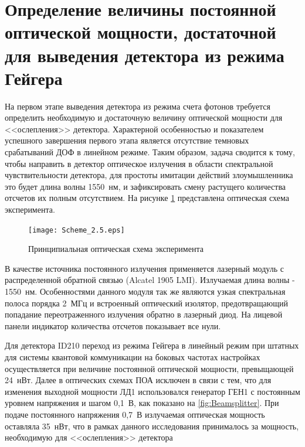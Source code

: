 
\section{Определение величины постоянной оптической мощности, достаточной для выведения детектора из режима Гейгера} \label{sec:ch2/sec5}

На первом этапе выведения детектора из режима счета фотонов требуется определить необходимую и достаточную величину оптической мощности для <<ослепления>> детектора. Характерной особенностью и показателем успешного завершения первого этапа является отсутствие темновых срабатываний ДОФ в линейном режиме. Таким образом, задача сводится к тому, чтобы направить в детектор оптическое излучения в области спектральной чувствительности детектора, для простоты имитации действий злоумышленника это будет длина волны 1550~нм, и зафиксировать смену растущего количества отсчетов их полным отсутствием. На рисунке \ref{fig:Scheme_2.5} представлена оптическая схема эксперимента. 


 \begin{figure}[ht]
  \centering
  \texttt{[image: Scheme\_2.5.eps]}
  \caption{Принципиальная оптическая схема эксперимента}
  \label{fig:Scheme_2.5}
\end{figure}

В качестве источника постоянного излучения применяется лазерный модуль с распределенной обратной связью (Alcatel 1905 LMI). Излучаемая длина волны - 1550~нм. Особенностями данного модуля так же являются узкая спектральная полоса порядка 2~МГц и встроенный оптический изолятор, предотвращающий попадание переотраженного излучения обратно в лазерный диод. 
 На лицевой панели индикатор количества отсчетов показывает все нули. 


Для детектора ID210 переход из режима Гейгера в линейный режим при штатных для системы квантовой коммуникации на боковых частотах настройках осуществляется при величине постоянной оптической мощности, превыщающей 24~нВт. Далее в оптических схемах ПОА исключен в связи с тем, что для изменения выходной мощности ЛД1 использовался генератор ГЕН1 с постоянным уровнем напряжения и шагом 0,1~В, как показано на \ref{fig:Beamsplitter}. При подаче постоянного напряжения 0,7~В излучаемая оптическая мощность оставляла 35~нВт, что в рамках данного исследования принималось за мощность, необходимую для <<ослепления>> детектора


